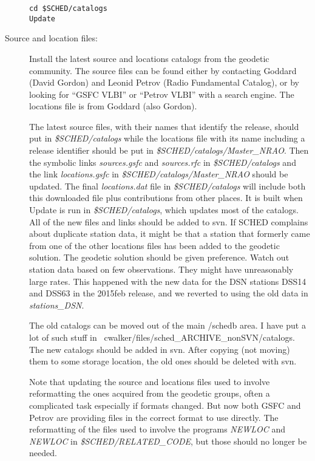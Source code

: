 \documentclass{report}
\begin{document}
\begin{description}
\begin{verbatim}
cd $SCHED/catalogs
Update
\end{verbatim}


\item [Source and location files:]

Install the latest source and locations catalogs from the geodetic
community.  The source files can be found either by contacting Goddard
(David Gordon) and Leonid Petrov (Radio Fundamental Catalog), or by
looking for ``GSFC VLBI'' or ``Petrov VLBI'' with a search engine.
The locations file is from Goddard (also Gordon).

The latest source files, with their names that identify the release,
should put in {\sl \$SCHED/catalogs} while the locations file with its
name including a release identifier should be put in {\sl
\$SCHED/catalogs/Master\_NRAO}.  Then the symbolic links {\sl
sources.gsfc} and {\sl sources.rfc} in {\sl \$SCHED/catalogs} and the
link {\sl locations.gsfc} in {\sl \$SCHED/catalogs/Master\_NRAO}
should be updated.  The final {\sl locations.dat} file in {\sl
\$SCHED/catalogs} will include both this downloaded file plus
contributions from other places.  It is built when Update is run in
{\sl \$SCHED/catalogs}, which updates most of the catalogs.  All of
the new files and links should be added to svn.  If SCHED complains
about duplicate station data, it might be that a station that formerly
came from one of the other locations files has been added to the
geodetic solution.  The geodetic solution should be given preference.
Watch out station data based on few observations.  They might have
unreasonably large rates.  This happened with the new data for the DSN
stations DSS14 and DSS63 in the 2015feb release, and we reverted to
using the old data in {\sl stations\_DSN}.

The old catalogs can be moved out of the main /schedb area.  I have
put a lot of such stuff in
~cwalker/files/sched\_ARCHIVE\_nonSVN/catalogs.  The new catalogs
should be added in svn.  After copying (not moving) them to some
storage location, the old ones should be deleted with svn.

Note that updating the source and locations files used to involve
reformatting the ones acquired from the geodetic groups, often a
complicated task especially if formats changed.  But now both GSFC and
Petrov are providing files in the correct format to use directly.  The
reformatting of the files used to involve the programs {\sl NEWLOC}
and {\sl NEWLOC} in {\sl \$SCHED/RELATED\_CODE}, but those should no
longer be needed.



\end{description}
\end{document}

